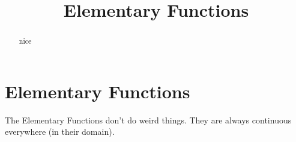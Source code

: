 \documentclass{ximera}
\title{Elementary Functions}
\begin{document}
\begin{abstract}
nice
\end{abstract}
\maketitle












\section*{Elementary Functions}




The Elementary Functions don't do weird things.  They are always continuous everywhere (in their domain).  
\end{document}

